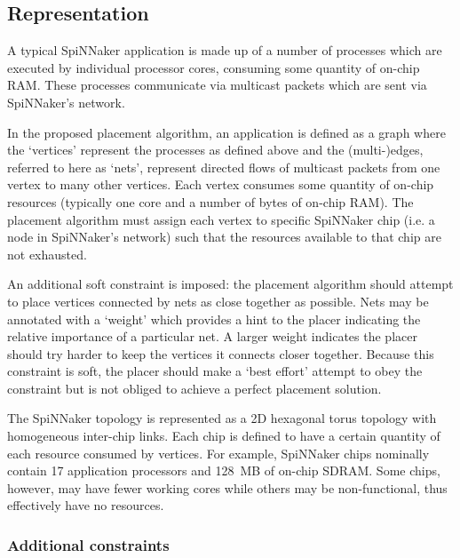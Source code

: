 		\subsection{Representation}
			
			A typical SpiNNaker application is made up of a number of processes which
			are executed by individual processor cores, consuming some quantity of
			on-chip RAM. These processes communicate via multicast packets which are
			sent via SpiNNaker's network.
			
			In the proposed placement algorithm, an application is defined as a graph
			where the `vertices' represent the processes as defined above and the
			(multi-)edges, referred to here as `nets', represent directed flows of
			multicast packets from one vertex to many other vertices. Each vertex
			consumes some quantity of on-chip resources (typically one core and a
			number of bytes of on-chip RAM). The placement algorithm must assign each
			vertex to specific SpiNNaker chip (i.e. a node in SpiNNaker's network)
			such that the resources available to that chip are not exhausted.
			
			
			An additional soft constraint is imposed: the placement algorithm should
			attempt to place vertices connected by nets as close together as
			possible. Nets may be annotated with a `weight' which provides a hint to
			the placer indicating the relative importance of a particular net. A
			larger weight indicates the placer should try harder to keep the vertices
			it connects closer together. Because this constraint is soft, the placer
			should make a `best effort' attempt to obey the constraint but is not
			obliged to achieve a perfect placement solution.
			
			The SpiNNaker topology is represented as a 2D hexagonal torus topology
			with homogeneous inter-chip links. Each chip is defined to have a certain
			quantity of each resource consumed by vertices. For example, SpiNNaker
			chips nominally contain 17 application processors and 128~MB of on-chip
			SDRAM. Some chips, however, may have fewer working cores while others may
			be non-functional, thus effectively have no resources.
			
			\subsubsection{Additional constraints}
				
